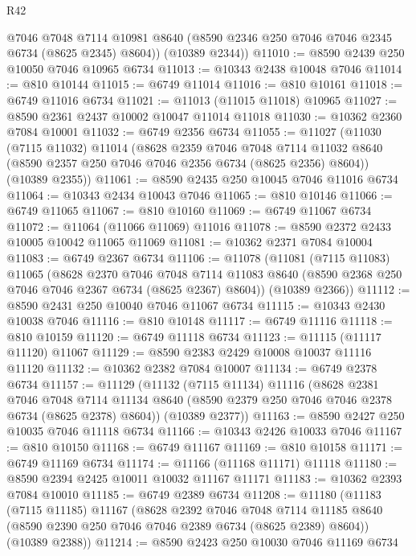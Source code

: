 \begin{lexlean}{R42}
\begin{coremodule}
{        @7046
        @7048
        @7114
        @10981
        @8640
        (@8590 @2346 @250 @7046 @7046 @2345 @6734 (@8625 @2345) @8604))
      (@10389 @2344))
@11010 := @8590 @2439 @250 @10050 @7046 @10965 @6734
@11013 := @10343 @2438 @10048 @7046
@11014 := @810 @10144
@11015 := @6749 @11014
@11016 := @810 @10161
@11018 := @6749 @11016 @6734
@11021 := @11013 (@11015 @11018) @10965
@11027 := @8590 @2361 @2437 @10002 @10047 @11014 @11018
@11030 := @10362 @2360 @7084 @10001
@11032 := @6749 @2356 @6734
@11055 := @11027
    (@11030
      (@7115 @11032)
      @11014
      (@8628
        @2359
        @7046
        @7048
        @7114
        @11032
        @8640
        (@8590 @2357 @250 @7046 @7046 @2356 @6734 (@8625 @2356) @8604))
      (@10389 @2355))
@11061 := @8590 @2435 @250 @10045 @7046 @11016 @6734
@11064 := @10343 @2434 @10043 @7046
@11065 := @810 @10146
@11066 := @6749 @11065
@11067 := @810 @10160
@11069 := @6749 @11067 @6734
@11072 := @11064 (@11066 @11069) @11016
@11078 := @8590 @2372 @2433 @10005 @10042 @11065 @11069
@11081 := @10362 @2371 @7084 @10004
@11083 := @6749 @2367 @6734
@11106 := @11078
    (@11081
      (@7115 @11083)
      @11065
      (@8628
        @2370
        @7046
        @7048
        @7114
        @11083
        @8640
        (@8590 @2368 @250 @7046 @7046 @2367 @6734 (@8625 @2367) @8604))
      (@10389 @2366))
@11112 := @8590 @2431 @250 @10040 @7046 @11067 @6734
@11115 := @10343 @2430 @10038 @7046
@11116 := @810 @10148
@11117 := @6749 @11116
@11118 := @810 @10159
@11120 := @6749 @11118 @6734
@11123 := @11115 (@11117 @11120) @11067
@11129 := @8590 @2383 @2429 @10008 @10037 @11116 @11120
@11132 := @10362 @2382 @7084 @10007
@11134 := @6749 @2378 @6734
@11157 := @11129
    (@11132
      (@7115 @11134)
      @11116
      (@8628
        @2381
        @7046
        @7048
        @7114
        @11134
        @8640
        (@8590 @2379 @250 @7046 @7046 @2378 @6734 (@8625 @2378) @8604))
      (@10389 @2377))
@11163 := @8590 @2427 @250 @10035 @7046 @11118 @6734
@11166 := @10343 @2426 @10033 @7046
@11167 := @810 @10150
@11168 := @6749 @11167
@11169 := @810 @10158
@11171 := @6749 @11169 @6734
@11174 := @11166 (@11168 @11171) @11118
@11180 := @8590 @2394 @2425 @10011 @10032 @11167 @11171
@11183 := @10362 @2393 @7084 @10010
@11185 := @6749 @2389 @6734
@11208 := @11180
    (@11183
      (@7115 @11185)
      @11167
      (@8628
        @2392
        @7046
        @7048
        @7114
        @11185
        @8640
        (@8590 @2390 @250 @7046 @7046 @2389 @6734 (@8625 @2389) @8604))
      (@10389 @2388))
@11214 := @8590 @2423 @250 @10030 @7046 @11169 @6734
}
\end{coremodule}
\end{lexlean}
